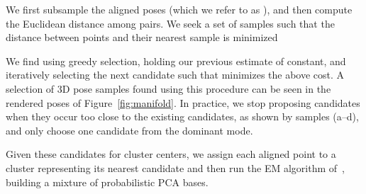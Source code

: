 \documentclass[10pt,twocolumn,letterpaper]{article}
\begin{document}
We first subsample the aligned poses (which we refer to as ), and
then compute the Euclidean distance  among pairs.  We seek a set
of  samples  such that the distance between points and their
nearest sample is minimized

We find  using greedy selection, holding our previous estimate of
 constant, and iteratively selecting the next candidate  such
that  minimizes the above cost. A selection of 3D pose
samples found using this procedure can be seen in the rendered poses
of Figure~\ref{fig:manifold}. In practice, we stop proposing
candidates when they occur too close to the existing candidates, as
shown by samples (a--d), and only choose one candidate from the
dominant mode.


Given these candidates for cluster centers, we assign each aligned
point to a cluster representing its nearest candidate and then run the
EM algorithm of~\cite{Tipping99probabilisticprincipal}, building a mixture of probabilistic PCA bases.
\end{document}
